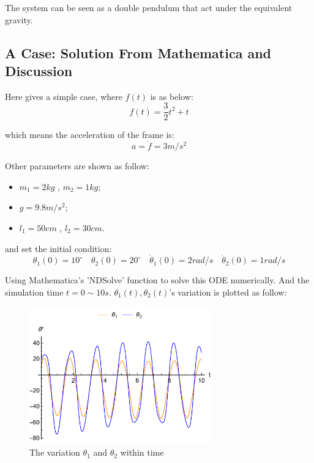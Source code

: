 The system can be seen as a double pendulum that act under the equivalent gravity.

\subsection{A Case: Solution From Mathematica and Discussion}

Here gives a simple case, where $f(t)$ is as below:
\begin{equation}
    f(t)=\frac{3}{2}t^2 + t
\end{equation}

which means the acceleration of the frame is:
\begin{equation}
    a=\ddot{f} = 3m/s^2
\end{equation}

Other parameters are shown as follow:
\begin{itemize}
    \item $m_1=2kg$ , $m_2=1kg$;
    \item $g=9.8m/s^2$;
    \item $l_1=50cm$ , $l_2=30cm$.
\end{itemize}

and set the initial condition:
\begin{equation}
    \theta_1(0)=10^\circ\quad
    \theta_2(0)=20^\circ\quad
    \dot{\theta}_1(0)=2rad/s\quad
    \dot{\theta}_2(0)=1rad/s
\end{equation}

Using Mathematica's 'NDSolve' function to solve this ODE numerically. 
And the simulation time $t=0\sim 10s$. 
$\theta_1(t),\theta_2(t)$'s variation is plotted as follow:
\begin{figure}[H]
    \centering
    \includegraphics[width=0.7\textwidth]{..//problem2/angle.pdf}
    \caption{The variation $\theta_1$ and $\theta_2$ within time}
\end{figure}

